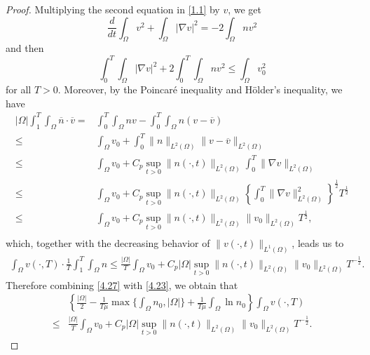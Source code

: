 \documentclass[12pt]{article}
\theoremstyle{plain}
\theoremstyle{definition}
\numberwithin{equation}{section}
\begin{document}
\begin{proof}[Proof]
Multiplying the second equation in \eqref{1.1} by $v$, we get
 \begin{equation*}
 \frac d{dt} \int_\Omega v^2 + \int_\Omega |\nabla v|^2 =-2\int_\Omega nv^2
\end{equation*}
and then
\begin{equation}\label{4.25}
\int^T_0 \int_\Omega |\nabla v|^2+2\int^T_0 \int_\Omega nv^2\leq \int_\Omega v_0^2
\end{equation}
for all $T>0$.
 Moreover,  by the Poincar\'{e} inequality and  H\"{o}lder's inequality, we have
 \begin{equation}\label{4.26}
\begin{split}
|\Omega|\int^T_1 \int_\Omega\overline{n}\cdot   \overline{v}=& \int^T_0 \int_\Omega nv- \int^T_0 \int_\Omega n(v- \overline{v})\\
  \leq & \int_\Omega v_0+  \int^T_0  \|n\|_{L^2(\Omega)} \|v-\overline{v}\|_{L^2(\Omega)}\\
  \leq & \int_\Omega v_0+ C_p\sup_{t>0}\|n(\cdot,t)\|_{L^2(\Omega)} \int^T_0  \|\nabla v\|_{L^2(\Omega)}\\
  \leq & \int_\Omega v_0+ C_p\sup_{t>0}\|n(\cdot,t)\|_{L^2(\Omega)} \left\{\int^T_0  \|\nabla v\|^2_{L^2(\Omega)}\right\}^{\frac12}T^{\frac12}\\
  \leq & \int_\Omega v_0+ C_p\sup_{t>0}\|n(\cdot,t)\|_{L^2(\Omega)}  \| v_0\|_{L^2(\Omega)}T^{\frac12},\\
 \end{split}
\end{equation}
which, together with the decreasing behavior of $\|v(\cdot,t)\|_{L^1(\Omega)}$, leads us to
 \begin{equation}\label{4.27}
\begin{split}
\int_\Omega v(\cdot,T)\cdot \frac1T \int^T_1 \int_\Omega n   \leq \frac{|\Omega|}T \int_\Omega v_0+  C_p |\Omega| \sup_{t>0}\|n(\cdot,t)\|_{L^2(\Omega)}  \| v_0\|_{L^2(\Omega)}T^{-\frac12}.
 \end{split}
\end{equation}
 Therefore combining \eqref{4.27} with \eqref{4.23}, we obtain that
  \begin{equation}\label{4.28}
  \begin{split}
&\left\{ \frac {|\Omega|}2-\frac 1{T\mu}\max\{\int_\Omega  n_0,|\Omega|\}  +\frac 1{T\mu} \int_\Omega \ln n_0 \right\}\int_\Omega v(\cdot,T)\\
  \leq &\frac{|\Omega|}T \int_\Omega v_0+ C_p |\Omega| \sup_{t>0}\|n(\cdot,t)\|_{L^2(\Omega)}  \| v_0\|_{L^2(\Omega)}T^{-\frac12}.
 \end{split}
\end{equation}


\end{proof}
\end{document}
